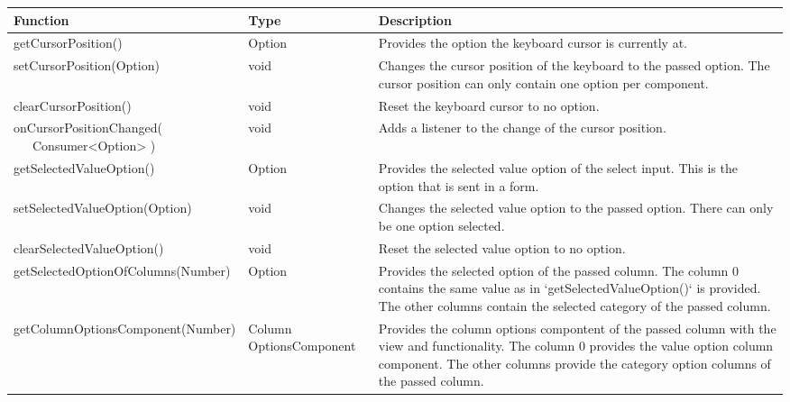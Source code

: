 \clearpage
\begin{table}[!htb] 
    \label{api:selectControllerReturn2}
    \scriptsize
    \setlength\extrarowheight{4pt}
    \begin{tabular}{ p{5cm} p{2.3cm} p{5.7cm} }
        \toprule[0.5pt]
        \textbf{Function}                    & \textbf{Type}          & \textbf{Description} \\
        \midrule    
        getCursorPosition()                  & Option                 & Provides the option the keyboard cursor is currently at. \\
        setCursorPosition(Option)            & void                   & Changes the cursor position of the keyboard to the passed option. 
                                                                        The cursor position can only  contain one option per component. \\
        clearCursorPosition()                & void                   & Reset the keyboard cursor to no option. \\
        \tbbr{
            onCursorPositionChanged( \\
                \ \ \ Consumer<Option>
            )}                               & void                   & Adds a listener to the change of the cursor position. \\
        getSelectedValueOption()             & Option                 & Provides the selected value option of the select input. 
                                                                        This is the option that is sent in a form. \\
        setSelectedValueOption(Option)       & void                   & Changes the selected value option to the passed option. 
                                                                        There can only be one option selected.  \\
        clearSelectedValueOption()           & void                   & Reset the selected value option to no option.  \\
        getSelectedOptionOfColumns(Number)   & Option                 & Provides the selected option of the passed column. 
                                                                        The column 0 contains the same value as in `getSelectedValueOption()` is provided. 
                                                                        The other columns contain the selected category of the passed column. \\
        getColumnOptionsComponent(Number)    & \raggedright Column\-
                                               Options\-Component     & Provides the column options compontent of the passed column with the view and functionality. 
                                                                        The column 0 provides the value option column component. 
                                                                        The other columns provide the category option columns of the passed column. \\
        \bottomrule[1.2pt]
    \end{tabular}
\end{table}

